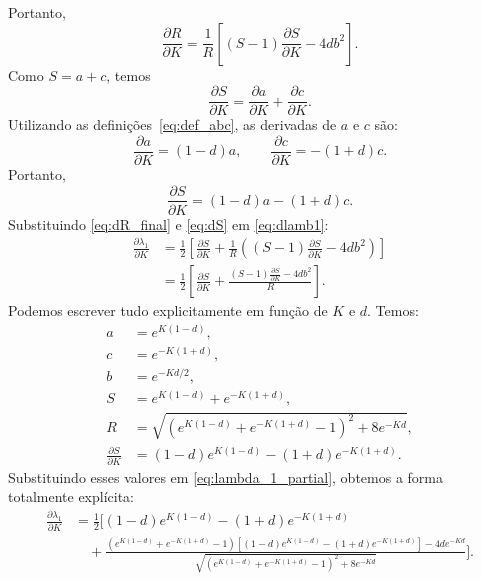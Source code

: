 \documentclass[11pt,a4paper]{article}
\begin{document}
%
Portanto,
%
\begin{equation}
    \frac{\partial R}{\partial K}
    = \frac{1}{R} \left[ (S - 1) \frac{\partial S}{\partial K} - 4 d b^2 \right].
    \label{eq:dR_final}
\end{equation}
%
Como \(S = a + c\), temos
%
\begin{equation}
    \frac{\partial S}{\partial K} = \frac{\partial a}{\partial K} + \frac{\partial c}{\partial K}.
\end{equation}
%
Utilizando as definições~\eqref{eq:def_abc}, as derivadas de \(a\) e \(c\) são:
%
\[
\frac{\partial a}{\partial K} = (1-d) a,
\qquad
\frac{\partial c}{\partial K} = -(1+d) c.
\]
%
Portanto,
%
\begin{equation}
    \frac{\partial S}{\partial K} = (1-d) a - (1+d) c.
    \label{eq:dS}
\end{equation}
%
Substituindo \eqref{eq:dR_final} e \eqref{eq:dS} em \eqref{eq:dlamb1}:
%
\begin{align}
    \frac{\partial \lambda_1}{\partial K}
    &= \frac{1}{2} \left[
        \frac{\partial S}{\partial K}
        + \frac{1}{R} \left( (S - 1) \frac{\partial S}{\partial K} - 4 d b^2 \right)
    \right] \\
    &= \frac{1}{2} \left[
        \frac{\partial S}{\partial K}
        + \frac{(S - 1) \frac{\partial S}{\partial K} - 4 d b^2}{R}
    \right].
\label{eq:lambda_1_partial}    
\end{align}
%
Podemos escrever tudo explicitamente em função de \(K\) e \(d\). Temos:
%
\begin{align}
    a &= e^{K(1-d)}, \\
    c &= e^{-K(1+d)}, \\
    b &= e^{-Kd/2}, \\
    S &= e^{K(1-d)} + e^{-K(1+d)}, \\
    R &= \sqrt{ \left( e^{K(1-d)} + e^{-K(1+d)} - 1 \right)^2 + 8 e^{-Kd} }, \\
    \frac{\partial S}{\partial K} &= (1-d) e^{K(1-d)} - (1+d) e^{-K(1+d)}.
\end{align}
%
Substituindo esses valores em \eqref{eq:lambda_1_partial}, obtemos a forma totalmente explícita:
%
\begin{align}
    \frac{\partial \lambda_1}{\partial K}
    &= \frac{1}{2} \Bigg[
        (1-d) e^{K(1-d)} - (1+d) e^{-K(1+d)} \nonumber \\
        &\quad + \frac{
            \left( e^{K(1-d)} + e^{-K(1+d)} - 1 \right)
            \left[ (1-d) e^{K(1-d)} - (1+d) e^{-K(1+d)} \right]
            - 4d e^{-Kd}
        }{
            \sqrt{ \left( e^{K(1-d)} + e^{-K(1+d)} - 1 \right)^2 + 8 e^{-Kd} }
        }
    \Bigg].
    \label{eq:dlamb1_explicita}
\end{align}
\end{document}
